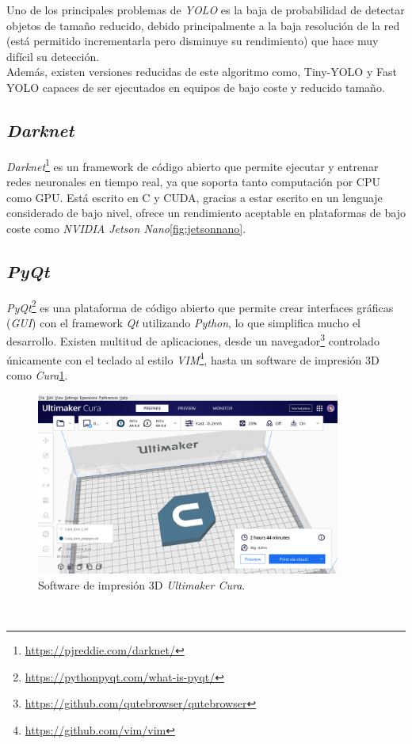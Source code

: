 Uno de los principales problemas de \textit{YOLO} es la baja de probabilidad de detectar objetos de tamaño reducido, debido principalmente a la baja resolución de la red (está permitido incrementarla pero disminuye su rendimiento) que hace muy difícil su detección.\\

Además, existen versiones reducidas de este algoritmo como, Tiny-YOLO y Fast YOLO capaces de ser ejecutados en equipos de bajo coste y reducido tamaño.\\

\subsection{\textit{Darknet}}
\label{subsection:darknet}
\textit{Darknet}\footnote{\url{https://pjreddie.com/darknet/}} es un framework de código abierto que permite ejecutar y entrenar redes neuronales en tiempo real, ya que soporta tanto computación por CPU como GPU. Está escrito en C y CUDA, gracias a estar escrito en un lenguaje considerado de bajo nivel, ofrece un rendimiento aceptable en plataformas de bajo coste como \textit{NVIDIA Jetson Nano}\ref{fig:jetsonnano}.\\

\subsection{\textit{PyQt}}
\label{subsection:pyqt}
\textit{PyQt}\footnote{\url{https://pythonpyqt.com/what-is-pyqt/}} es una plataforma de código abierto que permite crear interfaces gráficas (\textit{GUI}) con el framework \textit{Qt} utilizando \textit{Python}, lo que simplifica mucho el desarrollo. Existen multitud de aplicaciones, desde un navegador\footnote{\url{https://github.com/qutebrowser/qutebrowser}} controlado únicamente con el teclado al estilo \textit{VIM}\footnote{\url{https://github.com/vim/vim}}, hasta un software de impresión 3D como \textit{Cura}\ref{fig:cura}.\\

\begin{figure} [h!]
	\begin{center}
		\includegraphics[width=10cm]{figs/cura}
	\end{center}
	\caption{Software de impresión 3D \textit{Ultimaker Cura}.}
	\label{fig:cura}
\end{figure}\


